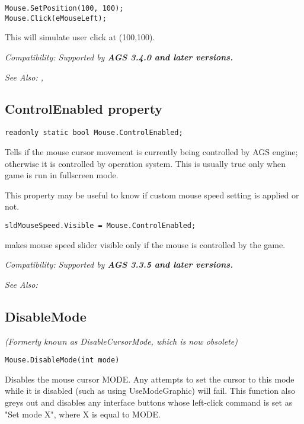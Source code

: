 \begin{verbatim}
Mouse.SetPosition(100, 100);
Mouse.Click(eMouseLeft);
\end{verbatim}
This will simulate user click at (100,100).

\it{Compatibility:} Supported by \bf{AGS 3.4.0} and later versions.

\it{See Also:} ,


\subsection{ControlEnabled property}\label{Mouse.ControlEnabled}%

\begin{verbatim}
readonly static bool Mouse.ControlEnabled;
\end{verbatim}
Tells if the mouse cursor movement is currently being controlled by AGS engine; otherwise it is controlled by operation system.
This is usually true only when game is run in fullscreen mode.

This property may be useful to know if custom mouse speed setting is applied or not.

\begin{verbatim}
sldMouseSpeed.Visible = Mouse.ControlEnabled;
\end{verbatim}
makes mouse speed slider visible only if the mouse is controlled by the game.

\it{Compatibility:} Supported by \bf{AGS 3.3.5} and later versions.

\it{See Also:} 


\subsection{DisableMode}\label{Mouse.DisableMode}%

\it{(Formerly known as DisableCursorMode, which is now obsolete)}

\begin{verbatim}
Mouse.DisableMode(int mode)
\end{verbatim}
Disables the mouse cursor MODE. Any attempts to set the cursor to this mode
while it is disabled (such as using UseModeGraphic) will fail. This function
also greys out and disables any interface buttons whose left-click command
is set as "Set mode X", where X is equal to MODE.

